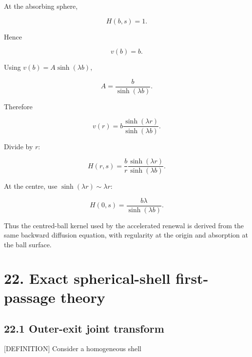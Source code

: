 \documentclass[11pt,a4paper]{article}
\begin{document}
At the absorbing sphere,

\begin{equation}
H(b,s)=1.
\tag{TRISO-FPT-019}
\label{eq:triso-fpt-019}
\end{equation}

Hence

\begin{equation}
v(b)=b.
\tag{TRISO-FPT-019A}
\label{eq:triso-fpt-019a}
\end{equation}

Using $v(b)=A\sinh(\lambda b)$,

\begin{equation}
A=\frac{b}{\sinh(\lambda b)}.
\tag{TRISO-FPT-019B}
\label{eq:triso-fpt-019b}
\end{equation}

Therefore

\begin{equation}
v(r)=b\frac{\sinh(\lambda r)}{\sinh(\lambda b)}.
\tag{TRISO-FPT-019C}
\label{eq:triso-fpt-019c}
\end{equation}

Divide by $r$:

\begin{equation}
\boxed{
H(r,s)=
\frac{b}{r}
\frac{\sinh(\lambda r)}{\sinh(\lambda b)}.
}
\tag{TRISO-FPT-019D}
\label{eq:triso-fpt-019d}
\end{equation}

At the centre, use $\sinh(\lambda r)\sim\lambda r$:

\begin{equation}
H(0,s)
=
\frac{b\lambda}{\sinh(\lambda b)}.
\tag{TRISO-FPT-019E}
\label{eq:triso-fpt-019e}
\end{equation}

Thus the centred-ball kernel used by the accelerated renewal is derived from the same backward diffusion equation, with regularity at the origin and absorption at the ball surface.

\section*{22. Exact spherical-shell first-passage theory}

\subsection*{22.1 Outer-exit joint transform}

[DEFINITION] Consider a homogeneous shell
\end{document}
